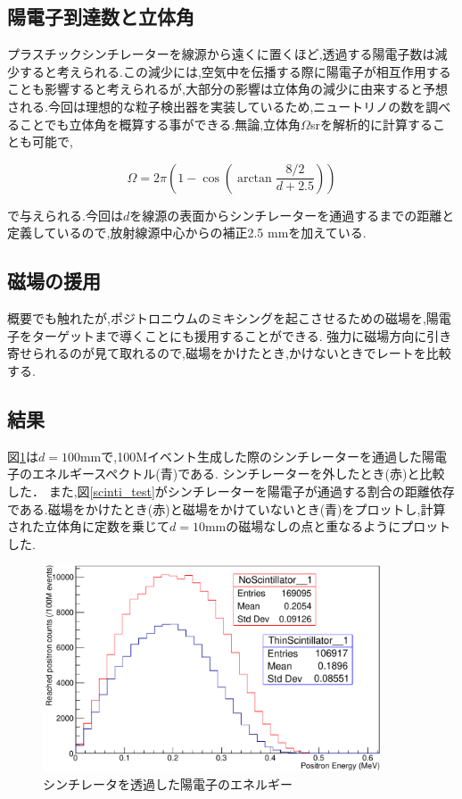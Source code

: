 \subsection{陽電子到達数と立体角}

プラスチックシンチレーターを線源から遠くに置くほど,透過する陽電子数は減少すると考えられる.この減少には,空気中を伝播する際に陽電子が相互作用することも影響すると考えられるが,大部分の影響は立体角の減少に由来すると予想される.今回は理想的な粒子検出器を実装しているため,ニュートリノの数を調べることでも立体角を概算する事ができる.無論,立体角$\Omega$srを解析的に計算することも可能で,

\begin{equation}
	\Omega = 2\pi \left( 1-\cos\left(\arctan\frac{8/2}{d+2.5}\right)\right)
\end{equation}

で与えられる.今回は$d$を線源の表面からシンチレーターを通過するまでの距離と定義しているので,放射線源中心からの補正2.5 mmを加えている.

\subsection{磁場の援用}
概要でも触れたが,ポジトロニウムのミキシングを起こさせるための磁場を,陽電子をターゲットまで導くことにも援用することができる.
強力に磁場方向に引き寄せられるのが見て取れるので,磁場をかけたとき,かけないときでレートを比較する.

\subsection{結果}

図\ref{test1}は$d=100$mmで,100Mイベント生成した際のシンチレーターを通過した陽電子のエネルギースペクトル(青)である. シンチレーターを外したとき(赤)と比較した．
また,図\ref{scinti_test}がシンチレーターを陽電子が通過する割合の距離依存である.磁場をかけたとき(赤)と磁場をかけていないとき(青)をプロットし,計算された立体角に定数を乗じて$d=10$mmの磁場なしの点と重なるようにプロットした.

\begin{figure}[htbp]
	\centering
		\includegraphics[width=10cm]{fig/test1.pdf}
	\caption{シンチレータを透過した陽電子のエネルギー}
	\label{test1}
\end{figure}


